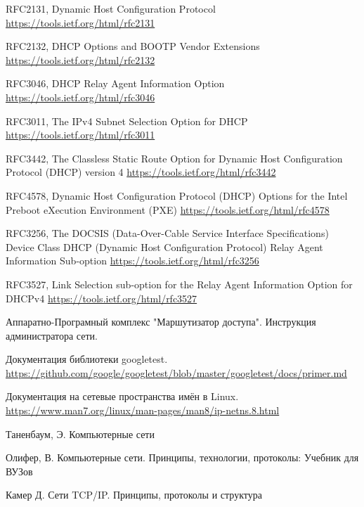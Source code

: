 \documentclass[14pt,a4paper]{extarticle}
\begin{document}
\begin{flushleft}
\begin{thebibliography}{9}
RFC2131, Dynamic Host Configuration Protocol \href{https://tools.ietf.org/html/rfc2131}{https://tools.ietf.org/html/rfc2131}

RFC2132, DHCP Options and BOOTP Vendor Extensions \href{https://tools.ietf.org/html/rfc2132}{https://tools.ietf.org/html/rfc2132}

RFC3046, DHCP Relay Agent Information Option \href{https://tools.ietf.org/html/rfc3046}{https://tools.ietf.org/html/rfc3046}

RFC3011, The IPv4 Subnet Selection Option for DHCP \href{https://tools.ietf.org/html/rfc3011}{https://tools.ietf.org/html/rfc3011}

RFC3442, The Classless Static Route Option for Dynamic Host Configuration Protocol (DHCP) version 4 \href{https://tools.ietf.org/html/rfc3442}{https://tools.ietf.org/html/rfc3442}

RFC4578, Dynamic Host Configuration Protocol (DHCP) Options for the Intel Preboot eXecution Environment (PXE) \href{https://tools.ietf.org/html/rfc4578}{https://tools.ietf.org/html/rfc4578}

RFC3256,  The DOCSIS (Data-Over-Cable Service Interface Specifications) Device Class DHCP (Dynamic Host Configuration Protocol) Relay Agent Information Sub-option
 \href{https://tools.ietf.org/html/rfc3256}{https://tools.ietf.org/html/rfc3256}

RFC3527, Link Selection sub-option for the Relay Agent Information Option for DHCPv4 \href{https://tools.ietf.org/html/rfc3527}{https://tools.ietf.org/html/rfc3527}

Аппаратно-Програмный комплекс "Маршутизатор доступа". Инструкция администратора сети.

Документация библиотеки googletest. \href{https://github.com/google/googletest/blob/master/googletest/docs/primer.md}{https://github.com/google/googletest/blob/master/googletest/docs/primer.md}

Документация на сетевые пространства имён в Linux. \href{https://www.man7.org/linux/man-pages/man8/ip-netns.8.html}{https://www.man7.org/linux/man-pages/man8/ip-netns.8.html}

Таненбаум, Э. Компьютерные сети

\bibitem{}
Олифер, В. Компьютерные сети. Принципы, технологии, протоколы: Учебник для ВУЗов

\bibitem{}
Камер Д. Сети TCP/IP. Принципы, протоколы и структура

\end{thebibliography}
\end{flushleft}
\end{document}
